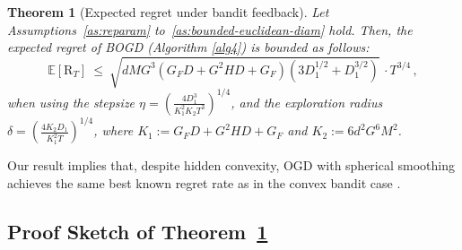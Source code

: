 \documentclass[a4paper,11pt,fullpage]{article}
\theoremstyle{plain}
\newtheorem{theorem}{Theorem}
\theoremstyle{definition}
\theoremstyle{plain}
\renewcommand{\leq}{~\le~}
\begin{document}
\begin{tcolorbox}[colframe=white!, top=2pt,left=2pt,right=2pt,bottom=2pt] 
\begin{theorem}[Expected regret under bandit feedback]
\label{thm:bandit}
Let Assumptions~\ref{as:reparam} to~\ref{as:bounded-euclidean-diam} hold. 
Then, the expected regret of BOGD (Algorithm \ref{alg4}) is bounded as follows:
\begin{equation*}
\mathbb{E}[\text{R}_T] \leq \sqrt{dM G^3 (G_FD + G^2 HD + G_F) (3 D_1^{1/2} + D_1^{3/2})}\,\cdot T^{3/4}\,,
\end{equation*}
when using the stepsize $\eta = \left(\frac{4 D_1^3}{K_1^2 K_2 T^3}\right)^{1/4}$, and the exploration radius $\delta = \left(\frac{4 K_2 D_1}{K_1^2 T}\right)^{1/4}$, where $K_1 := G_FD + G^2 HD + G_F$ and $K_2 := 6 d^2 G^6 M^2$. 
\end{theorem}
\end{tcolorbox}

Our result implies that, despite hidden convexity, OGD with spherical smoothing achieves the same best known regret rate as in the convex bandit case \citep{flaxman-kalai-mcmahan05}. 

\subsection{Proof Sketch of Theorem~\ref{thm:bandit}}
\label{subsec:bandit-proof-sketch}
\end{document}

